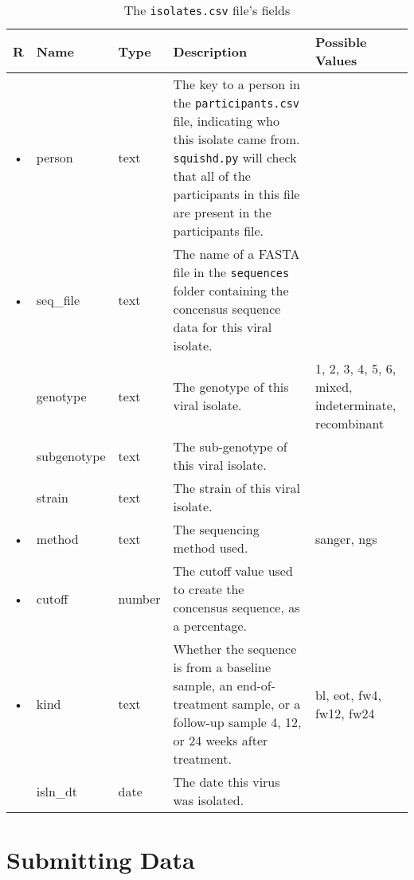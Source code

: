 \documentclass{article}
\begin{document}
\begin{table}[h!]
  \centering
  \caption{The \texttt{isolates.csv} file's fields}
  \label{tbl:isolates.csv}
  \begin{tabular}{cllp{6cm}p{4cm}}
    R & Name        & Type      & Description & Possible Values\\ \hline
    • & person      & text    & The key to a person in the
    \texttt{participants.csv} file, indicating who this isolate came
    from. \texttt{squishd.py} will check that all of the participants
    in this file are present in the participants file. & \\
    • & seq\_file   & text    & The name of a FASTA file in the
    \texttt{sequences} folder containing the concensus sequence data for this viral isolate. & \\ 
    & genotype    & text    & The genotype of this viral isolate. &
    1, 2, 3, 4, 5, 6, mixed, indeterminate, recombinant \\
    & subgenotype & text    & The sub-genotype of this viral isolate. & \\
    & strain      & text    & The strain of this viral isolate. & \\
    • & method      & text    & The sequencing method used. & sanger, ngs \\
    • & cutoff      & number  & The cutoff value used to create the concensus sequence, as a percentage. & \\
    • & kind        & text    & Whether the sequence is from a baseline sample, an end-of-treatment sample, or a follow-up sample 4, 12, or 24 weeks after treatment. & bl, eot, fw4, fw12, fw24 \\
    & isln\_dt    & date      & The date this virus was isolated. & \\
    
  \end{tabular}
\end{table}



\section{Submitting Data}


\end{document}
